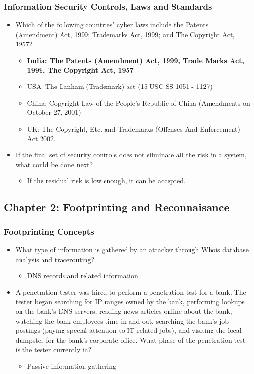 \subsubsection{Information Security Controls, Laws and Standards}
\begin{itemize}
    \item Which of the following countries' cyber laws include the Patents (Amendment) Act, 1999; Trademarks Act, 1999; and The Copyright Act, 1957?
    \begin{itemize}
        \item \textbf{India: The Patents (Amendment) Act, 1999, Trade Marks Act, 1999, The Copyright Act, 1957}
        \item USA: The Lanham (Trademark) act (15 USC SS 1051 - 1127)
        \item China: Copyright Law of the People's Republic of China (Amendments on October 27, 2001)
        \item UK: The Copyright, Etc. and Trademarks (Offenses And Enforcement) Act 2002.
    \end{itemize}
    \item If the final set of security controls does not eliminate all the risk in a system, what could be done next?
    \begin{itemize}
        \item If the residual risk is low enough, it can be accepted.
    \end{itemize}
\end{itemize}


\subsection{Chapter 2: Footprinting and Reconnaisance}
\subsubsection{Footprinting Concepts}
\begin{itemize}
    \item What type of information is gathered by an attacker through Whois database analysis and tracerouting?
    \begin{itemize}
        \item DNS records and related information
    \end{itemize}
    \item A penetration tester was hired to perform a penetration test for a bank. The tester began searching for IP ranges owned by the bank, performing lookups on the bank's DNS servers, reading news articles online about the bank, watching the bank employees time in and out, searching the bank's job postings (paying special attention to IT-related jobs), and visiting the local dumpster for the bank's corporate office. What phase of the penetration test is the tester currently in?
    \begin{itemize}
        \item Passive information gathering
    \end{itemize}
\end{itemize}
